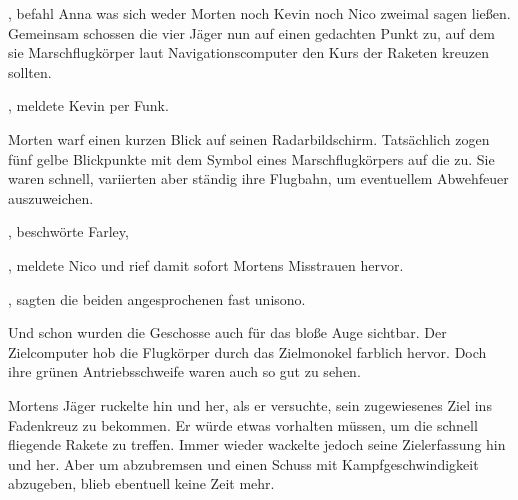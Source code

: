\par

, befahl Anna was sich weder Morten noch Kevin noch Nico zweimal sagen ließen. Gemeinsam schossen die vier Jäger nun auf einen gedachten Punkt zu, auf dem sie Marschflugkörper laut Navigationscomputer den Kurs der Raketen kreuzen sollten.

\par

, meldete Kevin per Funk.

\par

Morten warf einen kurzen Blick auf seinen Radarbildschirm. Tatsächlich zogen fünf gelbe Blickpunkte mit dem Symbol eines Marschflugkörpers auf die  zu. Sie waren schnell, variierten aber ständig ihre Flugbahn, um eventuellem Abwehfeuer auszuweichen.

\par

, beschwörte Farley, 

\par

, meldete Nico und rief damit sofort Mortens Misstrauen hervor. 

\par


\par

, sagten die beiden angesprochenen fast unisono.

\par

Und schon wurden die Geschosse auch für das bloße Auge sichtbar. Der Zielcomputer hob die Flugkörper durch das Zielmonokel farblich hervor. Doch ihre grünen Antriebsschweife waren auch so gut zu sehen.

\par

Mortens Jäger ruckelte hin und her, als er versuchte, sein zugewiesenes Ziel ins Fadenkreuz zu bekommen. Er würde etwas vorhalten müssen, um die schnell fliegende Rakete  zu treffen. Immer wieder wackelte jedoch seine Zielerfassung hin und her. Aber um abzubremsen und einen Schuss mit Kampfgeschwindigkeit abzugeben, blieb ebentuell keine Zeit mehr.

